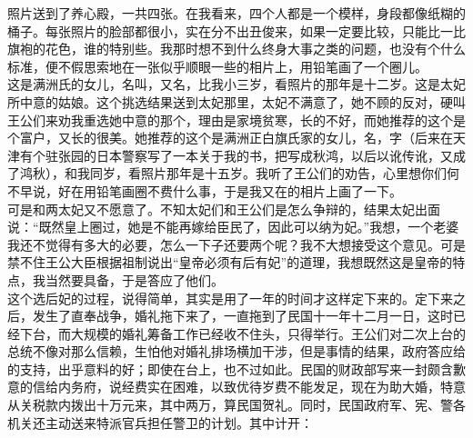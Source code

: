 照片送到了养心殿，一共四张。在我看来，四个人都是一个模样，身段都像纸糊的桶子。每张照片的脸部都很小，实在分不出丑俊来，如果一定要比较，只能比一比旗袍的花色，谁的特别些。我那时想不到什么终身大事之类的问题，也没有个什么标准，便不假思索地在一张似乎顺眼一些的相片上，用铅笔画了一个圈儿。\\

这是满洲氏的女儿，名叫，又名，比我小三岁，看照片的那年是十二岁。这是太妃所中意的姑娘。这个挑选结果送到太妃那里，太妃不满意了，她不顾的反对，硬叫王公们来劝我重选她中意的那个，理由是家境贫寒，长的不好，而她推荐的这个是个富户，又长的很美。她推荐的这个是满洲正白旗氏家的女儿，名，字（后来在天津有个驻张园的日本警察写了一本关于我的书，把写成秋鸿，以后以讹传讹，又成了鸿秋），和我同岁，看照片那年是十五岁。我听了王公们的劝告，心里想你们何不早说，好在用铅笔画圈不费什么事，于是我又在的相片上画了一下。\\

可是和两太妃又不愿意了。不知太妃们和王公们是怎么争辩的，结果太妃出面说：“既然皇上圈过，她是不能再嫁给臣民了，因此可以纳为妃。”我想，一个老婆我还不觉得有多大的必要，怎么一下子还要两个呢？我不大想接受这个意见。可是禁不住王公大臣根据祖制说出“皇帝必须有后有妃”的道理，我想既然这是皇帝的特点，我当然要具备，于是答应了他们。\\

这个选后妃的过程，说得简单，其实是用了一年的时间才这样定下来的。定下来之后，发生了直奉战争，婚礼拖下来了，一直拖到了民国十一年十二月一日，这时已经下台，而大规模的婚礼筹备工作已经收不住头，只得举行。王公们对二次上台的总统不像对那么信赖，生怕他对婚礼排场横加干涉，但是事情的结果，政府答应给的支持，出乎意料的好；即使在台上，也不过如此。民国的财政部写来一封颇含歉意的信给内务府，说经费实在困难，以致优待岁费不能发足，现在为助大婚，特意从关税款内拨出十万元来，其中两万，算民国贺礼。同时，民国政府军、宪、警各机关还主动送来特派官兵担任警卫的计划。其中计开：\\

